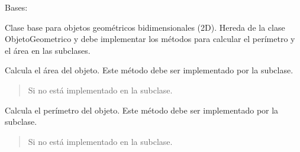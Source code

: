 \documentclass[letterpaper,10pt,spanish]{sphinxmanual}
\begin{document}

\begin{fulllineitems}
\label{\detokenize{pr8:pr8.3.Objeto2D}}
\pysigstartsignatures
{}
\pysigstopsignatures
\sphinxAtStartPar
Bases: {\hyperref[\detokenize{pr8:pr8.3.ObjetoGeometrico}]{}}

\sphinxAtStartPar
Clase base para objetos geométricos bidimensionales (2D).
Hereda de la clase ObjetoGeometrico y debe implementar los métodos
para calcular el perímetro y el área en las subclases.

\begin{fulllineitems}
\label{\detokenize{pr8:pr8.3.Objeto2D.area}}
\pysigstartsignatures
{}
\pysigstopsignatures
\sphinxAtStartPar
Calcula el área del objeto. Este método debe ser implementado por la subclase.
\begin{quote}\begin{description}
\sphinxAtStartPar
{} \textendash{} Si no está implementado en la subclase.

\end{description}\end{quote}

\end{fulllineitems}


\begin{fulllineitems}
\label{\detokenize{pr8:pr8.3.Objeto2D.perimetro}}
\pysigstartsignatures
{}
\pysigstopsignatures
\sphinxAtStartPar
Calcula el perímetro del objeto. Este método debe ser implementado por la subclase.
\begin{quote}\begin{description}
\sphinxAtStartPar
{} \textendash{} Si no está implementado en la subclase.

\end{description}\end{quote}

\end{fulllineitems}


\end{fulllineitems}
\end{document}
